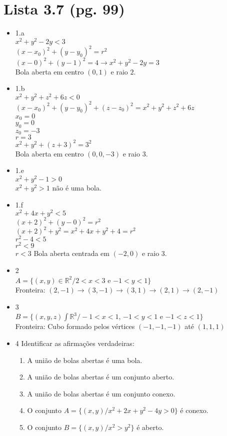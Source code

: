 \documentclass{article}
\begin{document}
\section*{Lista 3.7 (pg. 99)}
	\begin{itemize}
		\item 1.a
		\\$x^2+y^2-2y<3$
		\\$(x-x_0)^2+(y-y_0)^2 = r^2$
		\\$(x-0)^2+(y-1)^2 = 4 \to x^2+y^2-2y=3$
		\\Bola aberta em centro $(0,1)$ e raio $2$.
		\item 1.b
		\\$x^2+y^2+z^2+6z<0$
		\\$(x-x_0)^2+(y-y_0)^2+(z-z_0)^2 = x^2+y^2+z^2+6z$
		\\$x_0 = 0$
		\\$y_0 = 0$
		\\$z_0 = -3$
		\\$r = 3$
		\\$x^2+y^2+(z+3)^2=3^2$
		\\Bola aberta em centro $(0,0,-3)$ e raio $3$.
		\item 1.e
		\\$x^2+y^2-1>0$
		\\$x^2+y^2>1$ não é uma bola.
		\item 1.f
		\\$x^2+4x+y^2<5$
		\\$(x+2)^2+(y-0)^2=r^2$
		\\$(x+2)^2+y^2=x^2+4x+y^2+4=r^2$
		\\$r^2-4<5$
		\\$r^2<9$
		\\$r<3$
		Bola aberta centrada em $(-2,0)$ e raio $3$.
		\item 2
		\\$A = \{(x,y) \in \mathbb{R}^2 / 2<x<3$ e $-1<y<1\}$
		\\Fronteira: $(2,-1)\to (3,-1) \to (3,1) \to (2,1) \to (2,-1)$
		\item 3
		\\$B=\{(x,y,z)\int \mathbb{R}^3/-1<x<1$, $-1<y<1$ e $-1<z<1\}$
		\\Fronteira: Cubo formado pelos vértices $(-1,-1,-1)$ até $(1,1,1)$
		\item 4 Identificar as afirmações verdadeiras:
			\begin{enumerate}
				\item A união de bolas abertas é uma bola.
				\item A união de bolas abertas é um conjunto aberto.
				\item A união de bolas abertas é um conjunto conexo.
				\item O conjunto $A = \{(x,y)/x^2+2x+y^2-4y>0\}$ é conexo.
				\item O conjunto $B = \{(x,y)/x^2>y^2\}$ é aberto.
			\end{enumerate}
			

\end{itemize}
\end{document}
